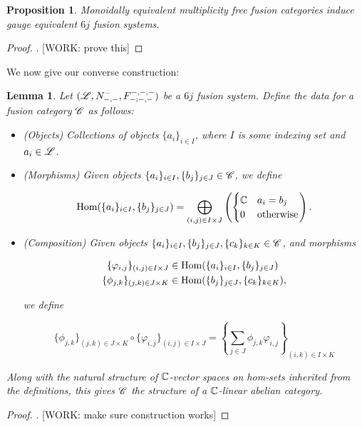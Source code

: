 \documentclass{article}
\newtheorem{lemma}{Lemma}[section]
\newtheorem{proposition}{Proposition}[section]
\theoremstyle{definition}
\numberwithin{figure}{section}
\begin{document}
\begin{proposition} Monoidally equivalent multiplicity free fusion categories induce gauge equivalent $6j$ fusion systems.
\end{proposition}
\begin{proof}. [WORK: prove this]
\end{proof}

We now give our converse construction:

\begin{lemma} Let $(\mathscr{L},N_{\--,\--}^{\--},F^{\--,\--,\--}_{\--;\--,\--})$ be a $6j$ fusion system. Define the data for a fusion category $\mathscr{C}$ as follows:

\begin{itemize}
\item (Objects) Collections of objects $\{a_i\}_{i\in I}$, where $I$ is some indexing set and $a_i\in \mathscr{L}$.
\item (Morphisms) Given objects $\{a_{i}\}_{i\in I},\{b_j\}_{j\in J}\in \mathscr{C}$, we define

$$\mathrm{Hom}(\{a_{i}\}_{i\in I},\{b_j\}_{j\in J})=\bigoplus_{(i,j)\in I\times J}\left(\begin{cases} \mathbb{C} & a_i=b_j \\ 0 & \text{otherwise}\end{cases}\right).$$

\item (Composition) Given objects $\{a_{i}\}_{i\in I},\{b_j\}_{j\in J},\{c_k\}_{k\in K}\in \mathscr{C}$, and morphisms 

\begin{align*}
\{\varphi_{i,j}\}_{(i,j)\in I\times J}&\in \mathrm{Hom}(\{a_{i}\}_{i\in I},\{b_j\}_{j\in J})\\
\{\phi_{j,k}\}_{(j,k)\in J\times K}&\in \mathrm{Hom}(\{b_{j}\}_{j\in J},\{c_k\}_{k\in K}),
\end{align*}

we define

$$\{\phi_{j,k}\}_{(j,k)\in J\times K}\circ \{\varphi_{i,j}\}_{(i,j)\in I\times J}=\left\{\sum_{j\in J}\phi_{j,k}\varphi_{i,j}\right\}_{(i,k)\in I\times K}$$

\end{itemize}

Along with the natural structure of $\mathbb{C}$-vector spaces on hom-sets inherited from the definitions, this gives $\mathscr{C}$ the structure of a $\mathbb{C}$-linear abelian category.
\end{lemma}
\begin{proof}. [WORK: make sure construction works]
\end{proof}
\end{document}

